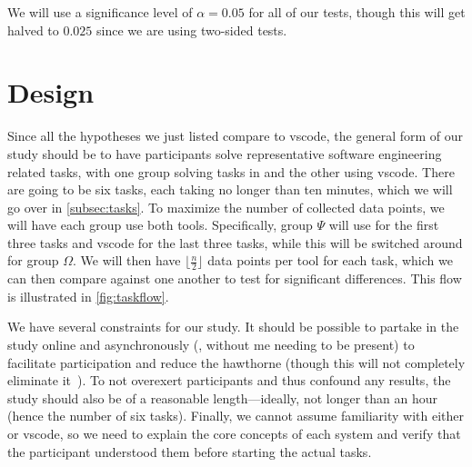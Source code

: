 \documentclass[../thesis]{subfiles}
\begin{document}
We will use a significance level of $\alpha = 0.05$ for all of our tests, though this will get halved to $0.025$ since we are using two-sided tests.

\section{Design}\label{sec:design}
Since all the hypotheses we just listed compare \SEE{} to \gls{vscode}, the general form of our study should be to have participants solve representative software engineering related tasks, with one group solving tasks in \SEE{} and the other using \gls{vscode}.
There are going to be six tasks, each taking no longer than ten minutes, which we will go over in \cref{subsec:tasks}.
To maximize the number of collected data points, we will have each group use both tools.
Specifically, group $\Psi$ will use \SEE{} for the first three tasks and \gls{vscode} for the last three tasks, while this will be switched around for group $\Omega$.
We will then have $\lfloor \frac{n}{2} \rfloor$ data points per tool for each task, which we can then compare against one another to test for significant differences.
This flow is illustrated in \cref{fig:taskflow}.

We have several constraints for our study.
It should be possible to partake in the study online and asynchronously (\ie, without me needing to be present) to facilitate participation and reduce the \gls{hawthorne} (though this will not completely eliminate it~\cite[\eg][]{evans2010}).
To not overexert participants and thus confound any results, the study should also be of a reasonable length---ideally, not longer than an hour (hence the number of six tasks).
Finally, we cannot assume familiarity with either \SEE{} or \gls{vscode}, so we need to explain the core concepts of each system and verify that the participant understood them before starting the actual tasks.

\newcommand{\cyes}{\textcolor{ForestGreen}{\textbf{[\ding{51}]}}}
\newcommand{\chmm}{\textcolor{BurntOrange}{\textbf{[\textit{?}]}}}
\newcommand{\cno}{\textcolor{Maroon}{\textbf{[\ding{55}]}}}
\end{document}
